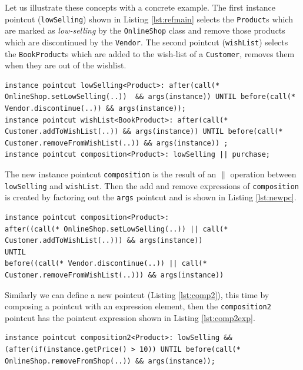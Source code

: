 \documentclass{llncs}
\begin{document}
Let us illustrate these concepts with a concrete example. The first instance pointcut  (\texttt{lowSelling})  shown in Listing \ref{lst:refmain} selects the \texttt{Product}s which are marked as \emph{low-selling} by the \texttt{OnlineShop} class and remove those products which are discontinued by the \texttt{Vendor}. The second pointcut (\texttt{wishList})  selects the \texttt{BookProduct}s which are added to the wish-list of a \texttt{Customer}, removes them when they are out of the wishlist.

\begin{lstlisting}[float=h!, caption={Two instance pointcuts composed to obtain a new one}, label={lst:refmain}]
instance pointcut lowSelling<Product>: after(call(* OnlineShop.setLowSelling(..))  && args(instance)) UNTIL before(call(* Vendor.discontinue(..)) && args(instance));
instance pointcut wishList<BookProduct>: after(call(* Customer.addToWishList(..)) && args(instance)) UNTIL before(call(* Customer.removeFromWishList(..)) && args(instance)) ;
instance pointcut composition<Product>: lowSelling || purchase;
\end{lstlisting}

The new instance pointcut \texttt{composition} is the result of an $\|$ operation between \texttt{lowSelling} and \texttt{wishList}. Then the add and remove expressions of \texttt{composition} is created by factoring out the \texttt{args} pointcut and is shown in Listing \ref{lst:newpc}. 

\begin{lstlisting}[float=h!, caption={The new instance pointcut after composition}, label={lst:newpc}]
instance pointcut composition<Product>: 
after((call(* OnlineShop.setLowSelling(..)) || call(* Customer.addToWishList(..))) && args(instance)) 
UNTIL 
before((call(* Vendor.discontinue(..)) || call(* Customer.removeFromWishList(..))) && args(instance))
\end{lstlisting}


Similarly we can define a new pointcut (Listing \ref{lst:comp2}), this time by composing a pointcut with an expression element, then the \texttt{composition2} pointcut has the pointcut expression shown in Listing \ref{lst:comp2exp}.

\begin{lstlisting}[float=h!, caption={An instance pointcuts and an expression is composed}, label={lst:comp2}]
instance pointcut composition2<Product>: lowSelling && (after(if(instance.getPrice() > 10)) UNTIL before(call(* OnlineShop.removeFromShop(..)) && args(instance));
\end{lstlisting}
\end{document}
